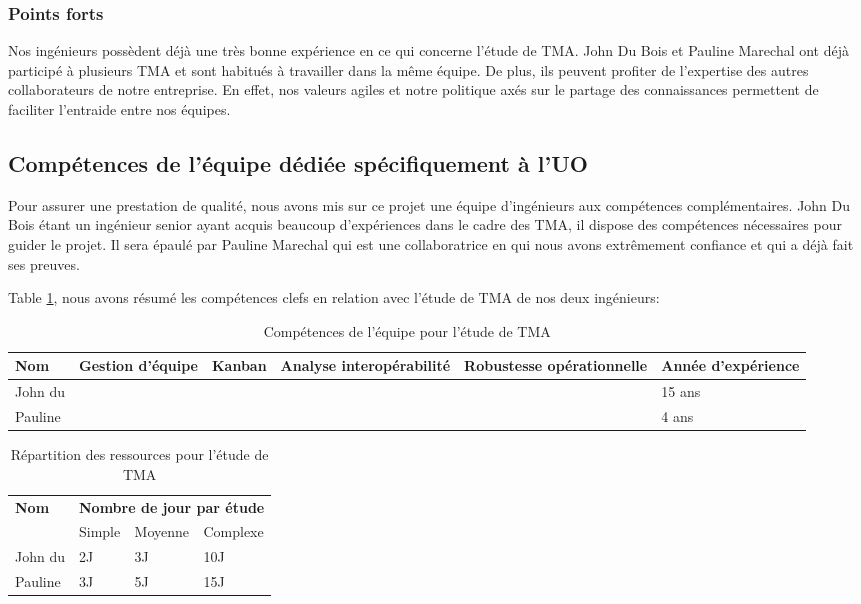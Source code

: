 	\subsubsection{Points forts}
	Nos ingénieurs possèdent déjà une très bonne expérience en ce qui concerne l’étude de TMA. John Du Bois et Pauline Marechal ont déjà participé à plusieurs TMA et sont habitués à travailler dans la même équipe. De plus, ils peuvent profiter de l’expertise des autres collaborateurs de notre entreprise. En effet, nos valeurs agiles et notre politique axés sur le partage des connaissances permettent de faciliter l’entraide entre nos équipes.
	
	\subsection{Compétences de l'équipe dédiée spécifiquement à l'UO}
	Pour assurer une prestation de qualité, nous avons mis sur ce projet une équipe d’ingénieurs aux compétences complémentaires. John Du Bois étant un ingénieur senior ayant acquis beaucoup d’expériences dans le cadre des TMA, il dispose des compétences nécessaires pour guider le projet. Il sera épaulé par Pauline Marechal qui est une collaboratrice en qui nous avons extrêmement confiance et qui a déjà fait ses preuves.
	
	Table \ref{table:competences1}, nous avons résumé les compétences clefs en relation avec l’étude de TMA de nos deux ingénieurs:
	
	\begin{table}[H]
			\centering
	\begin{tabular}{|p{3cm}|p{1.8cm}|c|p{3cm}|p{3cm}|p{3cm}|}
		\hline
		\textbf{Nom} & \textbf{Gestion d'équipe} & \textbf{Kanban} & \textbf{Analyse interopérabilité} & \textbf{Robustesse opérationnelle} & \textbf{Année d'expérience}\\
		\hline
		John du \bsc{Bois} & \checkmark & \checkmark &\checkmark  & & 15 ans\\
		\hline
		Pauline \bsc{Marechal} & &\checkmark  & &\checkmark  & 4 ans\\
		\hline
	\end{tabular}
	\caption{Compétences de l'équipe pour l'étude de TMA}
	\label{table:competences1}
	\end{table}
	
		\begin{table}[H]
			\centering
\begin{tabular}{|p{3cm}|p{3cm}|p{3cm}|p{3cm}|}
	\hline
\multirow{2}{*}{\textbf{Nom}}&\multicolumn{3}{c|}{\textbf{Nombre de jour par étude}}\\ 
\cline{2-4}
& Simple & Moyenne & Complexe \\ 
	\hline John du \bsc{Bois} & 2J & 3J & 10J \\ 
	\hline Pauline \bsc{Marechal} & 3J & 5J & 15J \\ 
	\hline 
\end{tabular} 
			\caption{Répartition des ressources pour l'étude de TMA}
			\label{table:ressources1}
		\end{table}
